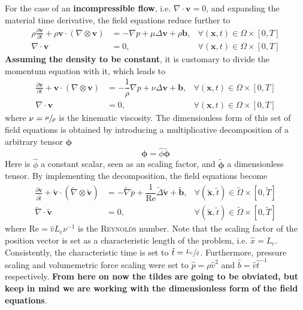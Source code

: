 \documentclass[]{scrartcl}
\newcommand{\pfrac}[2]{\frac{\partial #1}{\partial #2}}
\newcommand{\bs}[1]{\boldsymbol{#1}}
\begin{document}
For the case of an \textbf{incompressible flow}, i.e. $\nabla \cdot \mathbf{v} = 0$, and expanding the material time derivative, the field equations reduce further to
\begin{equation*}
	\begin{aligned}
		\rho \pfrac{\mathbf{v}}{t} +  \rho \mathbf{v} \cdot (\nabla \otimes \mathbf{v})&=  -\nabla p + \mu \Delta \mathbf{v} + \rho \mathbf{b}, &\forall (\mathbf{x}, t) \in \Omega \times \left[0, T \right] \\
		\nabla \cdot \mathbf{v}&= 0, &\forall (\mathbf{x}, t) \in \Omega \times  \left[0, T \right]
	\end{aligned}
\end{equation*}
\textbf{Assuming the density to be constant}, it is customary to divide the momentum equation with it, which leads to 
\begin{equation*}
	\begin{aligned}
		\pfrac{\mathbf{v}}{t} + \mathbf{v} \cdot (\nabla \otimes \mathbf{v})&=  - \dfrac{1}{\rho}\nabla p + \nu \Delta \mathbf{v} + \mathbf{b}, &\forall (\mathbf{x}, t) \in \Omega \times \left[0, T \right] \\
		\nabla \cdot \mathbf{v}&= 0, &\forall (\mathbf{x}, t) \in \Omega \times  \left[0, T \right]
	\end{aligned}
\end{equation*}
where $\nu = \sfrac{\mu}{\rho}$ is the kinematic viscosity. The dimensionless form of this set of field equations is obtained by introducing a multiplicative decomposition of a arbitrary tensor $\bs{\phi}$
\begin{equation*}
	\bs{\phi} = \hat{\phi} \tilde{\bs{\phi}}
\end{equation*}
Here is $\hat{\phi}$ a constant scalar, seen as an scaling factor, and $ \tilde{\bs{\phi}}$ a dimensionless tensor. By implementing the decomposition, the field equations become
\begin{equation*}
	\begin{aligned}
		\pfrac{\mathbf{\tilde{v}}}{\tilde{t}} + \mathbf{\tilde{v}} \cdot (\tilde{\nabla} \otimes \mathbf{\tilde{v}})&=  -\tilde{\nabla} \tilde{p}+ \dfrac{1}{\mathrm{Re}}\tilde{\Delta} \mathbf{\tilde{v}} + \mathbf{\tilde{b}}, &\forall (\mathbf{\tilde{x}}, \tilde{t}) \in \tilde{\Omega} \times [0, \tilde{T} ] \\
		\tilde{\nabla} \cdot \mathbf{\tilde{v}}&= 0, &\forall (\mathbf{\tilde{x}}, \tilde{t}) \in\tilde{ \Omega} \times  [0, \tilde{T} ]
	\end{aligned}
\end{equation*}
where $\mathrm{Re} = \hat{v}L_\textrm{c}\nu^{-1}$ is the \textsc{Reynolds} number. Note that the scaling factor of the position vector is set as a characteristic length of the problem, i.e. $\hat{x} = L_\textrm{c}$. Consistently, the characteristic time is set to $\hat{t} = \sfrac{L_\textrm{c}}{\hat{v}}$. Furthermore, pressure scaling and volumemetric force scaling were set to $\hat{p} = \rho \hat{v}^2$ and $\hat{b} = \hat{v}\hat{t}^{-1}$ respectively. \textbf{From here on now the tildes are going to be obviated, but keep in mind we are working with the dimensionless form of the field equations}.\\
\end{document}
